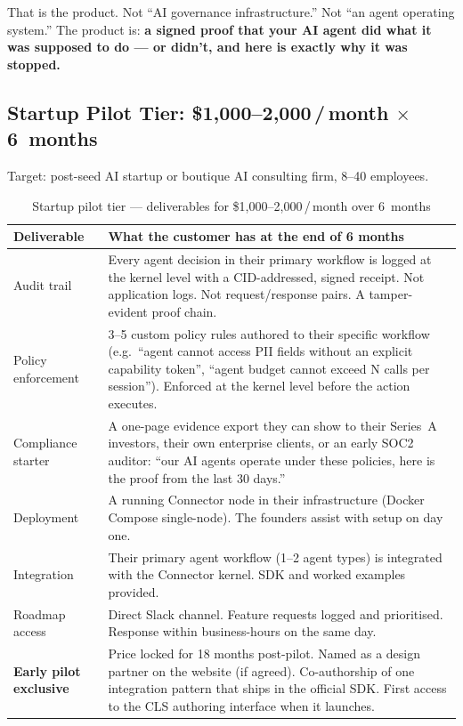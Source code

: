 \noindent That is the product. Not ``AI governance infrastructure.'' Not
``an agent operating system.'' The product is: \textbf{a signed proof that
your AI agent did what it was supposed to do --- or didn't, and here is
exactly why it was stopped.}

\subsection*{Startup Pilot Tier: \$1,000--2,000\,/\,month $\times$ 6~months}

Target: post-seed AI startup or boutique AI consulting firm, 8--40 employees.

\begin{table}[H]
\centering
\renewcommand{\arraystretch}{1.55}
\begin{tabularx}{\textwidth}{@{}lX@{}}
\toprule
\textbf{Deliverable} & \textbf{What the customer has at the end of 6 months} \\
\midrule
Audit trail & Every agent decision in their primary workflow is logged at
  the kernel level with a CID-addressed, signed receipt. Not application
  logs. Not request/response pairs. A tamper-evident proof chain. \\
Policy enforcement & 3--5 custom policy rules authored to their specific
  workflow (e.g.\ ``agent cannot access PII fields without an explicit
  capability token'', ``agent budget cannot exceed N calls per session'').
  Enforced at the kernel level before the action executes. \\
Compliance starter & A one-page evidence export they can show to their
  Series~A investors, their own enterprise clients, or an early SOC2
  auditor: ``our AI agents operate under these policies, here is the
  proof from the last 30 days.'' \\
Deployment & A running Connector node in their infrastructure (Docker
  Compose single-node). The founders assist with setup on day one. \\
Integration & Their primary agent workflow (1--2 agent types) is integrated
  with the Connector kernel. SDK and worked examples provided. \\
Roadmap access & Direct Slack channel. Feature requests logged and
  prioritised. Response within business-hours on the same day. \\
\midrule
\textbf{Early pilot exclusive} & Price locked for 18 months post-pilot.
  Named as a design partner on the website (if agreed). Co-authorship of
  one integration pattern that ships in the official SDK. First access to
  the CLS authoring interface when it launches. \\
\bottomrule
\end{tabularx}
\caption{Startup pilot tier --- deliverables for \$1,000--2,000\,/\,month over 6~months}
\end{table}

